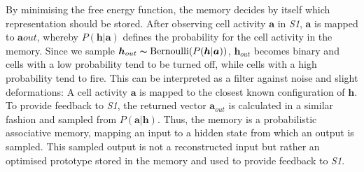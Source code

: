 By minimising the free energy function, the memory decides by itself which representation should be stored.
After observing cell activity $\boldsymbol{a}$ in \emph{S1}, $\boldsymbol{a}$ is mapped to $\boldsymbol{a}{out}$, whereby $P(\boldsymbol{h}|\boldsymbol{a})$ defines the probability for the cell activity in the memory. Since we sample $\boldsymbol{h}_{out} \thicksim \text{Bernoulli}(P(\boldsymbol{h} | \boldsymbol{a}) )$, $\boldsymbol{h}_{out}$ becomes binary and cells with a low probability tend to be turned off, while cells with a high probability tend to fire.
This can be interpreted as a filter against noise and slight deformations: A cell activity $\boldsymbol{a}$ is mapped to the closest known configuration of $\boldsymbol{h}$.
To provide feedback to \emph{S1}, the returned vector $\boldsymbol{a}_{out}$ is calculated in a similar fashion and sampled from $P(\boldsymbol{a}|\boldsymbol{h})$. Thus, the memory is a probabilistic associative memory, mapping an input to a hidden state from which an output is sampled.
This sampled output is not a reconstructed input but rather an optimised prototype stored in the memory and used to provide feedback to \emph{S1}.





